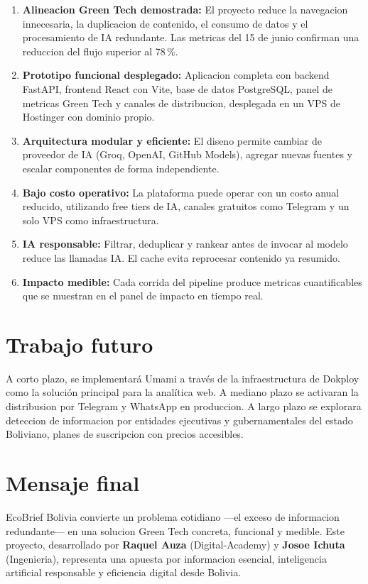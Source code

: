 \documentclass[12pt,oneside]{report}
\begin{document}
\begin{enumerate}[nosep]
    \item \textbf{Alineacion Green Tech demostrada:} El proyecto reduce la navegacion innecesaria, la duplicacion de contenido, el consumo de datos y el procesamiento de IA redundante. Las metricas del 15 de junio confirman una reduccion del flujo superior al 78\,\%.
    \item \textbf{Prototipo funcional desplegado:} Aplicacion completa con backend FastAPI, frontend React con Vite, base de datos PostgreSQL, panel de metricas Green Tech y canales de distribucion, desplegada en un VPS de Hostinger con dominio propio.
    \item \textbf{Arquitectura modular y eficiente:} El diseno permite cambiar de proveedor de IA (Groq, OpenAI, GitHub Models), agregar nuevas fuentes y escalar componentes de forma independiente.
    \item \textbf{Bajo costo operativo:} La plataforma puede operar con un costo anual reducido, utilizando free tiers de IA, canales gratuitos como Telegram y un solo VPS como infraestructura.
    \item \textbf{IA responsable:} Filtrar, deduplicar y rankear antes de invocar al modelo reduce las llamadas IA. El cache evita reprocesar contenido ya resumido.
    \item \textbf{Impacto medible:} Cada corrida del pipeline produce metricas cuantificables que se muestran en el panel de impacto en tiempo real.
\end{enumerate}

\section*{Trabajo futuro}

A corto plazo, se implementará Umami a través de la infraestructura de Dokploy como la solución principal para la analítica web. A mediano plazo se activaran la distribusion por Telegram y WhatsApp en produccion. A largo plazo se explorara deteccion de informacion por entidades ejecutivas y gubernamentales del estado Boliviano, planes de suscripcion con precios accesibles.

\section*{Mensaje final}

EcoBrief Bolivia convierte un problema cotidiano ---el exceso de informacion redundante--- en una solucion Green Tech concreta, funcional y medible. Este proyecto, desarrollado por \textbf{Raquel Auza} (Digital-Academy) y \textbf{Josoe Ichuta} (Ingenieria), representa una apuesta por informacion esencial, inteligencia artificial responsable y eficiencia digital desde Bolivia.
\end{document}
